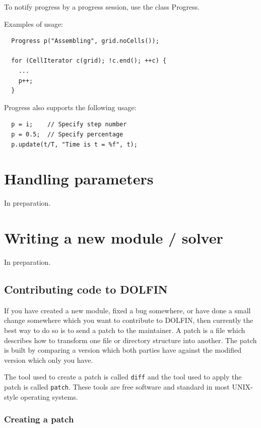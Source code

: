 \documentclass[12pt]{article}
\begin{document}
To notify progress by a progress session, use the class
Progress.

Examples of usage:

\begin{verbatim}
  Progress p("Assembling", grid.noCells());
  
  for (CellIterator c(grid); !c.end(); ++c) {
    ...
    p++;
  }
\end{verbatim}

Progress also supports the following usage:

\begin{verbatim}
  p = i;    // Specify step number
  p = 0.5;  // Specify percentage
  p.update(t/T, "Time is t = %f", t);
\end{verbatim}

\cleardoublepage
\section{Handling parameters}

In preparation.

\cleardoublepage
\section{Writing a new module / solver}

In preparation.

\subsection{Contributing code to DOLFIN}

If you have created a new module, fixed a bug somewhere, or have done
a small change somewhere which you want to contribute to DOLFIN, then
currently the best way to do so is to send a patch to the maintainer. A patch
is a file which describes how to transform one file or directory structure
into another. The patch is built by comparing a version which both parties
have against the modified version which only you have.

The tool used to create a patch is called \texttt{diff} and the tool
used to apply the patch is called \texttt{patch}. These tools are free
software and standard in most UNIX-style operating systems.

\subsubsection{Creating a patch}
\end{document}
